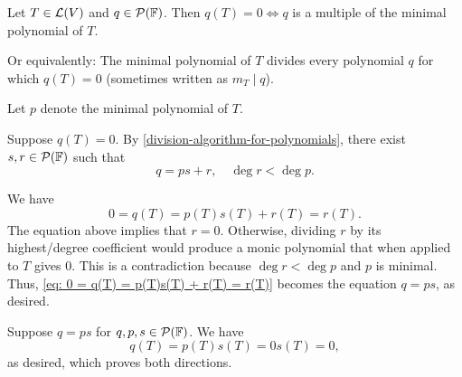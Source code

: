 \setcounter{thm}{28}
\begin{thm}
  \label{thm: every zero polynomial is a multiple of the minimal polynomial}
  Let $T\in \mathcal{L}(V)$ and $q \in \mathcal{P} (\mathbb{F})$. Then $q(T)=0 \iff q$ is a multiple of the minimal polynomial of $T$.

  Or equivalently: The minimal polynomial of $T$ divides every polynomial $q$ for which $q(T) = 0$ (sometimes written as $m_T \mid q$).
\end{thm}
\begin{prf}
  Let $p$ denote the minimal polynomial of $T$.

  \begin{description}

    \item{\Rightarrowdirection}{
      Suppose $q(T)=0$.
      By \ref{division-algorithm-for-polynomials}, there exist $s,r \in \mathcal{P} (\mathbb{F})$ such that
      \begin{equation}
        q=ps+r, \quad \deg r < \deg p.
      \end{equation}

      We have
      \begin{equation}
        \label{eq: 0 = q(T) = p(T)s(T) + r(T) = r(T)}
        0 = q(T) = p(T)s(T) + r(T) = r(T).
      \end{equation}
      The equation above implies that $r=0$. Otherwise, dividing $r$ by its highest\-/degree coefficient would produce a monic polynomial that when applied to $T$ gives $0$. This is a contradiction because $\deg r < \deg p$ and $p$ is minimal. Thus, \eqref{eq: 0 = q(T) = p(T)s(T) + r(T) = r(T)} becomes the equation $q=ps$, as desired.
    }
    \item{\Leftarrowdirection}{
      Suppose $q=ps$ for $q,p,s \in \mathcal{P}(\mathbb{F})$. We have
      \begin{equation}
        q(T) = p(T)s(T)=0s(T)=0,
      \end{equation}
      as desired, which proves both directions.
    }
  \end{description}
   \vspace*{-\baselineskip}
\end{prf}

